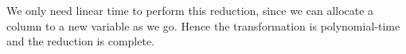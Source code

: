 \documentclass{article}
\begin{document}
\begin{enumerate}[leftmargin={*}, font={\bf}, label={\arabic*.}, ref={\arabic*}]
    We only need linear time to perform this reduction, since we can allocate a column to a new
    variable as we go. Hence the transformation is polynomial-time and the reduction is complete.
\end{enumerate}
\end{document}
